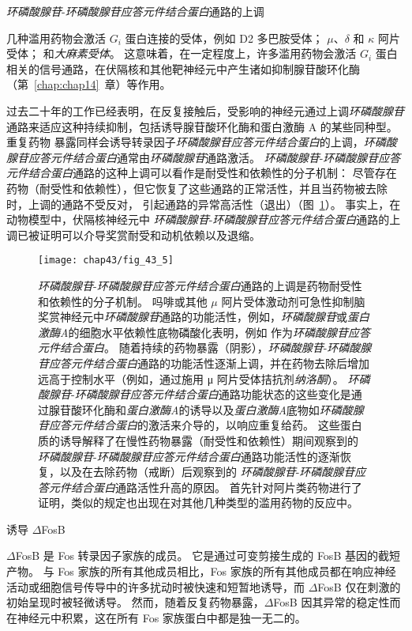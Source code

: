 \textit{环磷酸腺苷}-\textit{环磷酸腺苷应答元件结合蛋白}通路的上调

几种滥用药物会激活 $ G_i $ 蛋白连接的受体，例如 D2 多巴胺受体；
$ \mu $、$ \delta $ 和 $ \kappa $ 阿片受体；
和\textit{大麻素受体}。
这意味着，在一定程度上，许多滥用药物会激活 $ G_i $ 蛋白相关的信号通路，在伏隔核和其他靶神经元中产生诸如抑制腺苷酸环化酶（第~\ref{chap:chap14}~章）等作用。


过去二十年的工作已经表明，在反复接触后，受影响的神经元通过上调\textit{环磷酸腺苷}通路来适应这种持续抑制，包括诱导腺苷酸环化酶和蛋白激酶 A 的某些同种型。
重复药物 暴露同样会诱导转录因子\textit{环磷酸腺苷应答元件结合蛋白}的上调，\textit{环磷酸腺苷应答元件结合蛋白}通常由\textit{环磷酸腺苷}通路激活。
\textit{环磷酸腺苷}-\textit{环磷酸腺苷应答元件结合蛋白}通路的这种上调可以看作是耐受性和依赖性的分子机制：
尽管存在药物（耐受性和依赖性），但它恢复了这些通路的正常活性，并且当药物被去除时，上调的通路不受反对， 引起通路的异常高活性（退出）（图~\ref{fig:43_5}）。
事实上，在动物模型中，伏隔核神经元中 \textit{环磷酸腺苷}-\textit{环磷酸腺苷应答元件结合蛋白}通路的上调已被证明可以介导奖赏耐受和动机依赖以及退缩。


\begin{figure}[htbp]
	\centering
	\texttt{[image: chap43/fig\_43\_5]}
	\caption{\textit{环磷酸腺苷}-\textit{环磷酸腺苷应答元件结合蛋白}通路的上调是药物耐受性和依赖性的分子机制。
		吗啡或其他 $\mu$ 阿片受体激动剂可急性抑制脑奖赏神经元中\textit{环磷酸腺苷}通路的功能活性，例如，\textit{环磷酸腺苷}或\textit{蛋白激酶A}的细胞水平依赖性底物磷酸化表明，例如 作为\textit{环磷酸腺苷应答元件结合蛋白}。
		随着持续的药物暴露（阴影），\textit{环磷酸腺苷}-\textit{环磷酸腺苷应答元件结合蛋白}通路的功能活性逐渐上调，并在药物去除后增加远高于控制水平（例如，通过施用 μ 阿片受体拮抗剂\textit{纳洛酮}）。 \textit{环磷酸腺苷}-\textit{环磷酸腺苷应答元件结合蛋白}通路功能状态的这些变化是通过腺苷酸环化酶和\textit{蛋白激酶A}的诱导以及\textit{蛋白激酶A}底物如\textit{环磷酸腺苷应答元件结合蛋白}的激活来介导的，以响应重复给药。
		这些蛋白质的诱导解释了在慢性药物暴露（耐受性和依赖性）期间观察到的 \textit{环磷酸腺苷}-\textit{环磷酸腺苷应答元件结合蛋白}通路功能活性的逐渐恢复，以及在去除药物（戒断）后观察到的 \textit{环磷酸腺苷}-\textit{环磷酸腺苷应答元件结合蛋白}通路活性升高的原因。
		首先针对阿片类药物进行了证明，类似的规定也出现在对其他几种类型的滥用药物的反应中\cite{trimble2002molecular}。}
	\label{fig:43_5}
\end{figure}


诱导 $\Delta$FosB

$\Delta$FosB 是 Fos 转录因子家族的成员。
它是通过可变剪接生成的 FosB 基因的截短产物。
与 Fos 家族的所有其他成员相比，Fos 家族的所有其他成员都在响应神经活动或细胞信号传导中的许多扰动时被快速和短暂地诱导，而 $\Delta$FosB 仅在刺激的初始呈现时被轻微诱导。
然而，随着反复药物暴露，$\Delta$FosB 因其异常的稳定性而在神经元中积累，这在所有 Fos 家族蛋白中都是独一无二的。


